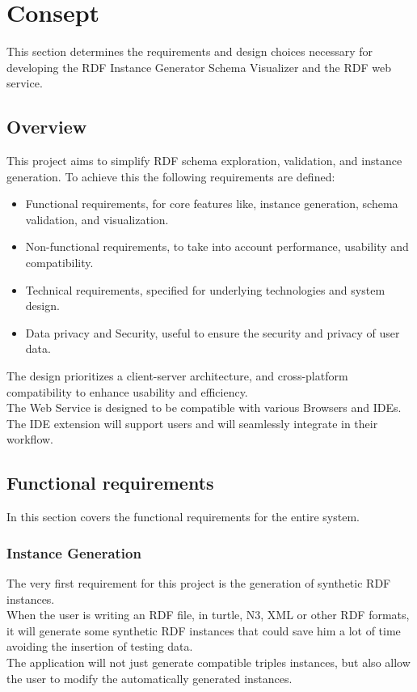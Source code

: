 \chapter{Consept\label{cha:chapter3}}
This section determines the requirements and design choices necessary for developing the RDF Instance Generator Schema Visualizer and the RDF web service.

\section{Overview\label{sec:reqoverview}}

This project aims to simplify RDF schema exploration, validation, and instance generation. To achieve this the following requirements are defined: 
\begin{itemize}
    \item Functional requirements, for core features like, instance generation, schema validation, and visualization.
    \item Non-functional requirements, to take into account performance, usability and compatibility.
    \item Technical requirements, specified for underlying technologies and system design.
    \item Data privacy and Security, useful to ensure the security and privacy of user data.
\end{itemize}

The design prioritizes a client-server architecture, and cross-platform compatibility to enhance usability and efficiency. 
\\
The Web Service is designed to be compatible with various Browsers and IDEs. 
\\
The IDE extension will support users and will seamlessly integrate in their workflow.
\section{Functional requirements\label{sec:techreq}}
In this section covers the functional requirements for the entire system.

\subsection{Instance Generation\label{sec:reqsuba}}
The very first requirement for this project is the generation of synthetic RDF instances.
\\
When the user is writing an RDF file, in turtle, N3, XML or other RDF formats, it will generate some synthetic RDF instances that could save him a lot of time avoiding the insertion of testing data.
\\
The application will not just generate compatible triples instances, but also allow the user to modify the automatically generated instances.

